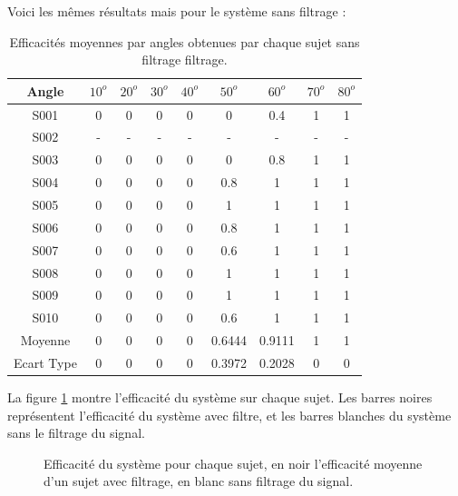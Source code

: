 \documentclass[letterpaper, twoside, 12pt, memoire, creativecommons, hyperref]{thETS}
\begin{document}
Voici les mêmes résultats mais pour le système sans filtrage :

\begin{table}[ht]
	\caption{Efficacités moyennes par angles obtenues par chaque sujet sans filtrage filtrage. }
		\begin{tabular}{|c|c|c|c|c|c|c|c|c|}
		\hline
			Angle & $10^{o}$ & $20^{o}$ & $30^{o}$ & $40^{o}$ & $50^{o}$ & $60^{o}$ & $70^{o}$ & $80^{o}$\\
	    \hline
	    		S001 & 0 & 0 & 0 & 0 & 0 & 0.4 & 1 & 1\\
	    \hline
			S002 & - & - & - & - & - & - & - & -\\
	    \hline
	    		S003 & 0 & 0 & 0 & 0 & 0 & 0.8 & 1 & 1\\
	    \hline
	    		S004 & 0 & 0 & 0 & 0 & 0.8 & 1 & 1 & 1\\
	    \hline
	    		S005 & 0 & 0 & 0 & 0 & 1 & 1 & 1 & 1\\
	    \hline
	    		S006 & 0 & 0 & 0 & 0 & 0.8 & 1 & 1 & 1\\
	    \hline
	    		S007 & 0 & 0 & 0 & 0 & 0.6 & 1 & 1 & 1\\
	    \hline
	    		S008 & 0 & 0 & 0 & 0 & 1 & 1 & 1 & 1\\
	    \hline
	    		S009 & 0 & 0 & 0 & 0 & 1 & 1 & 1 & 1\\
	    \hline
	    		S010 & 0 & 0 & 0 & 0 & 0.6 & 1 & 1 & 1\\
	    \hline
	    		Moyenne & 0 & 0 & 0 & 0 & 0.6444 & 0.9111 & 1 & 1\\
	    \hline
	    		Ecart Type & 0 & 0 & 0 & 0 & 0.3972 & 0.2028 & 0 & 0\\
	    \hline
		\end{tabular}
	\label{tab:effFangles}
\end{table}

La figure \ref{fig:effsujets} montre l'efficacité du système sur chaque sujet. Les barres noires représentent l'efficacité du système avec filtre, et les barres blanches du système sans le filtrage du signal. 

\begin{figure}
	\centering
	\caption{Efficacité du système pour chaque sujet, en noir l'efficacité moyenne d'un sujet avec filtrage, en blanc sans filtrage du signal.}
	\label{fig:effsujets}
\end{figure}
\end{document}
